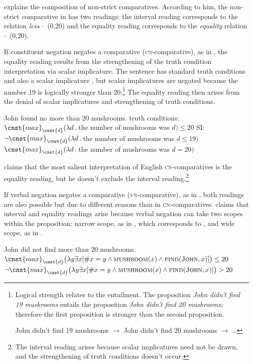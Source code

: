 \documentclass[output=paper,
]{langscibook}
\begin{document}
\cite{nouwen2008upper} explains the composition of non-strict comparatives. According to him, the non-strict comparative in  has two readings: the interval reading corresponds to the relation \textit{less} -- (0,20) and the equality reading corresponds to the \textit{equality} relation -- (0,20).

If constituent negation negates a comparative (\textsc{cn-}comparative), as in , the equality reading results from the strengthening of the truth condition interpretation via scalar implicature. The sentence has standard truth conditions  and also a scalar implicature , but scalar implicatures are negated because the number 19 is logically stronger than 20.\footnote{Logical strength relates to the entailment. The proposition \textit{John didn't find 19 mushrooms} entails the proposition \textit{John didn't find 20 mushrooms}; therefore the first proposition is stronger than the second proposition.

\ea John didn't find 19 mushrooms $\rightarrow$ John didn't find 20 mushrooms $\rightarrow$ \dots
\z } The equality reading then arises from the denial of scalar implicatures and strengthening of truth conditions.

\ea \label{ex:sen} John found no more than 20 mushrooms.
        \ea truth conditions: $\cnst{max}_{\cnst{d}}(\lambda d\,.\,$the number of mushrooms was $d)\leq 20$ \label{ex:tc_1}
		\ex SI: $\neg\cnst{max}_{\cnst{d}}(\lambda d\,.\,$the number of mushrooms was $d\leq 19)$ \label{ex:si_1}
\ex $\cnst{max}_{\cnst{d}}(\lambda d\,.\,$the number of mushrooms was $d=20)$ 
\z
\z


\noindent \cite{nouwen2008upper} claims that the most salient interpretation of English \textsc{cn-}comparatives is the equality reading, but he doesn't exclude the interval reading.\footnote{The interval reading arises because scalar implicatures need not be drawn, and the strengthening of truth conditions doesn't occur.} 

If verbal negation negates a comparative (\textsc{vn-}comparative), as in , both readings are also possible but due to different reasons than in \textsc{cn-}comparatives. \cite{nouwen2008upper} claims that interval and equality readings arise because verbal negation can take two scopes within the proposition: narrow scope, as in , which corresponds to , and wide scope, as in .

\ea  \label{ex:ver} John did not find more than 20 mushrooms. 
	\ea $\cnst{max}_{\cnst{d}}\big(\lambda y\exists x[\#x=y \wedge \textsc{mushroom}(x) \wedge \textsc{find}(\textsc{John},x)]\big) \leq 20$ \label{ex:eng_exh}
	\ex $\neg\cnst{max}_{\cnst{d}}\big(\lambda y\exists x[\#x=y \wedge \textsc{mushroom}(x) \wedge \textsc{find}(\textsc{John},x)]\big) > 20$ \label{ex:eng_int}
\z
\z
\end{document}
